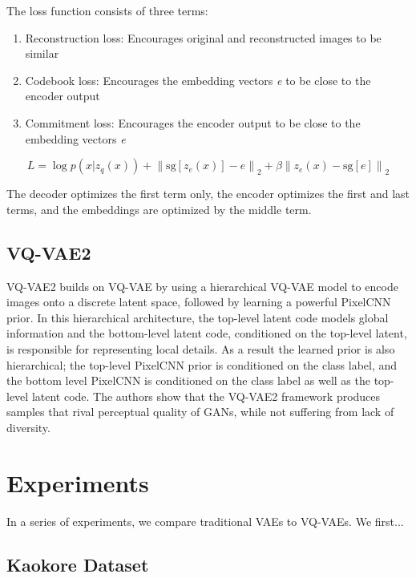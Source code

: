 \documentclass{article}
\begin{document}
The loss function consists of three terms: 
\begin{enumerate}
\item Reconstruction loss: Encourages original and reconstructed images to be similar
\item Codebook loss: Encourages the embedding vectors \textit{e} to be close to the encoder output 
\item Commitment loss: Encourages the encoder output to be close to the embedding vectors \textit{e} 
\end{enumerate}

\begin{equation}
L = \log{p(x|z_q(x))} + {\|\textrm{sg}[z_e(x)]-e\|}_2 + \beta{\|z_e(x)-\textrm{sg}[e]\|}_2
\end{equation}


The decoder optimizes the first term only, the encoder optimizes the first and last terms, and the embeddings are optimized by the middle term. 

\subsection{VQ-VAE2}

VQ-VAE2 builds on VQ-VAE by using a hierarchical VQ-VAE model to encode images onto a discrete latent space, followed by learning a powerful PixelCNN prior. In this hierarchical architecture, the top-level latent code models global information and the bottom-level latent code, conditioned on the top-level latent, is responsible for representing local details. As a result the learned prior is also hierarchical; the top-level PixelCNN prior is conditioned on the class label, and the bottom level PixelCNN is conditioned on the class label as well as the top-level latent code. The authors show that the VQ-VAE2 framework produces samples that rival perceptual quality of GANs, while not suffering from lack of diversity. 

\section{Experiments}

In a series of experiments, we compare traditional VAEs to VQ-VAEs. We first...

\subsection{Kaokore Dataset}
\end{document}

